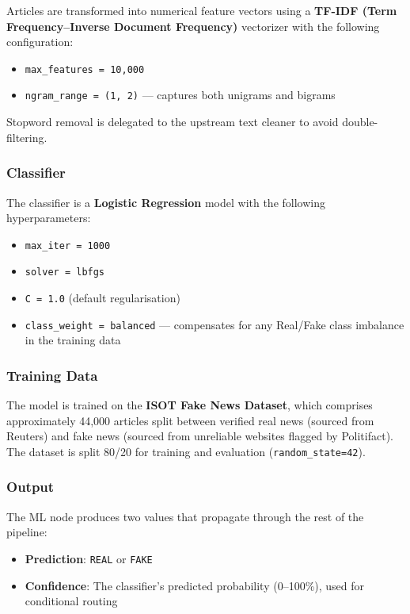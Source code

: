 \documentclass[12pt, a4paper]{article}
\begin{document}
Articles are transformed into numerical feature vectors using a
\textbf{TF-IDF (Term Frequency--Inverse Document Frequency)} vectorizer
with the following configuration:

\begin{itemize}[leftmargin=2em]
    \item \texttt{max\_features = 10{,}000}
    \item \texttt{ngram\_range = (1, 2)} --- captures both unigrams and
          bigrams
\end{itemize}

Stopword removal is delegated to the upstream text cleaner to avoid
double-filtering.

\subsubsection{Classifier}

The classifier is a \textbf{Logistic Regression} model with the following
hyperparameters:

\begin{itemize}[leftmargin=2em]
    \item \texttt{max\_iter = 1000}
    \item \texttt{solver = lbfgs}
    \item \texttt{C = 1.0} (default regularisation)
    \item \texttt{class\_weight = balanced} --- compensates for any
          Real/Fake class imbalance in the training data
\end{itemize}

\subsubsection{Training Data}

The model is trained on the \textbf{ISOT Fake News Dataset}, which
comprises approximately 44,000 articles split between verified real news
(sourced from Reuters) and fake news (sourced from unreliable websites
flagged by Politifact). The dataset is split 80/20 for training and
evaluation (\texttt{random\_state=42}).

\subsubsection{Output}

The ML node produces two values that propagate through the rest of the
pipeline:
\begin{itemize}[leftmargin=2em]
    \item \textbf{Prediction}: \texttt{REAL} or \texttt{FAKE}
    \item \textbf{Confidence}: The classifier's predicted probability
          (0--100\%), used for conditional routing
\end{itemize}
\end{document}
